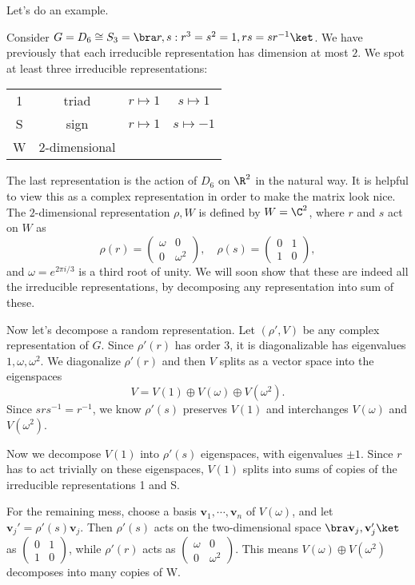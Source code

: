 \documentclass[a4paper]{article}
\begin{document}
Let's do an example.
\begin{eg}
  Consider $G = D_6 \cong S_3 = \bra r, s: r^3 = s^2 = 1, rs = sr^{-1}\ket$. We have previously that each irreducible representation has dimension at most $2$. We spot at least three irreducible representations:
  \begin{center}
    \begin{tabular}{cccc}
      1 & triad & $r \mapsto 1$ & $s \mapsto 1$\\
      S & sign & $r \mapsto 1$ & $s \mapsto -1$\\
      W & $2$-dimensional &
    \end{tabular}
  \end{center}
  The last representation is the action of $D_6$ on $\R^2$ in the natural way. It is helpful to view this as a complex representation in order to make the matrix look nice. The $2$-dimensional representation $\rho, W$ is defined by $W = \C^2$, where $r$ and $s$ act on $W$ as
  \[
    \rho(r) =
    \begin{pmatrix}
      \omega & 0\\
      0 & \omega^2
    \end{pmatrix},\quad
    \rho(s) =
    \begin{pmatrix}
      0 & 1\\
      1 & 0
    \end{pmatrix},
  \]
  and $\omega = e^{2\pi i/3}$ is a third root of unity. We will soon show that these are indeed all the irreducible representations, by decomposing any representation into sum of these.

  Now let's decompose a random representation. Let $(\rho', V)$ be any complex representation of $G$. Since $\rho'(r)$ has order $3$, it is diagonalizable has eigenvalues $1, \omega, \omega^2$. We diagonalize $\rho'(r)$ and then $V$ splits as a vector space into the eigenspaces
  \[
    V = V(1) \oplus V(\omega) \oplus V(\omega^2).
  \]
  Since $srs^{-1}= r^{-1}$, we know $\rho'(s)$ preserves $V(1)$ and interchanges $V(\omega)$ and $V(\omega^2)$.

  Now we decompose $V(1)$ into $\rho'(s)$ eigenspaces, with eigenvalues $\pm1$. Since $r$ has to act trivially on these eigenspaces, $V(1)$ splits into sums of copies of the irreducible representations 1 and S.

  For the remaining mess, choose a basis $\mathbf{v}_1, \cdots, \mathbf{v}_n$ of $V(\omega)$, and let $\mathbf{v}_j' = \rho'(s) \mathbf{v}_j$. Then $\rho'(s)$ acts on the two-dimensional space $\bra \mathbf{v}_j, \mathbf{v}_j'\ket$ as $\begin{pmatrix}0 & 1\\1 & 0\end{pmatrix}$, while $\rho'(r)$ acts as $\begin{pmatrix} \omega & 0\\0 & \omega^2\end{pmatrix}$. This means $V(\omega) \oplus V(\omega^2)$ decomposes into many copies of W.
\end{eg}
\end{document}
